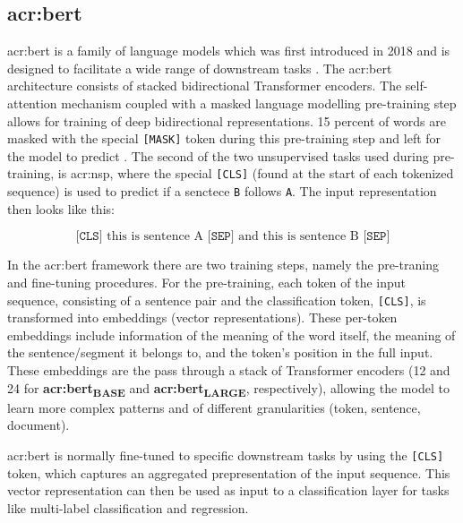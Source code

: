 \subsection[BERT]{\acrshort{acr:bert}}

\gls{acr:bert} is a family of language models which was first introduced in 2018 and is designed to facilitate a wide range of downstream tasks \citep[5]{devlinBERTPretrainingDeep2019}. The \acrshort{acr:bert} architecture consists of stacked bidirectional Transformer encoders. The self-attention mechanism coupled with a masked language modelling pre-training step allows for training of deep bidirectional representations. 15 percent of words are masked with the special \texttt{[MASK]} token during this pre-training step and left for the model to predict \citep[4]{devlinBERTPretrainingDeep2019}. The second of the two unsupervised tasks used during pre-training, is \gls{acr:nsp}, where the special \texttt{[CLS]} (found at the start of each tokenized sequence) is used to predict if a senctece \texttt{B} follows \texttt{A}. The input representation then looks like this:

$$
    \texttt{[CLS]}\text{ this is sentence A }\texttt{[SEP]}\text{ and this is sentence B }\texttt{[SEP]}
$$

In the \acrshort{acr:bert} framework there are two training steps, namely the pre-traning and fine-tuning procedures. For the pre-training, each token of the input sequence, consisting of a sentence pair and the classification token, \texttt{[CLS]}, is transformed into embeddings (vector representations). These per-token embeddings include information of the meaning of the word itself, the meaning of the sentence/segment it belongs to, and the token's position in the full input. These embeddings are the pass through a stack of Transformer encoders (12 and 24 for \textbf{\acrshort{acr:bert}\textsubscript{BASE}} and \textbf{\acrshort{acr:bert}\textsubscript{LARGE}}, respectively), allowing the model to learn more complex patterns and of different granularities (token, sentence, document).

\acrshort{acr:bert} is normally fine-tuned to specific downstream tasks by using the \texttt{[CLS]} token, which captures an aggregated prepresentation of the input sequence. This vector representation can then be used as input to a classification layer for tasks like multi-label classification and regression.


